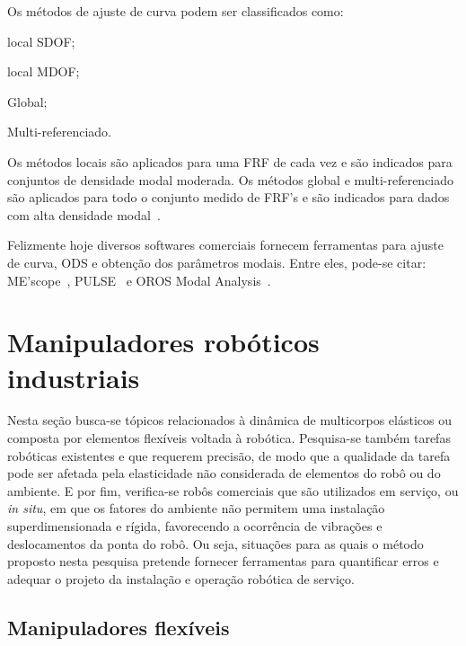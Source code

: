 Os métodos de ajuste de curva podem ser classificados como: 
%
\begin{enumerate*}[label=\emph{\alph*})]
	\item local SDOF;
	\item local MDOF;
	\item Global;
	\item Multi-referenciado.
\end{enumerate*}
%
Os métodos locais são aplicados para uma FRF de cada vez e são indicados para
conjuntos de densidade modal moderada. Os métodos global e multi-referenciado
são aplicados para todo o conjunto medido de FRF's e são indicados para dados
com alta densidade modal~\cite{schwarz1999experimental}. 

Felizmente hoje diversos softwares comerciais fornecem ferramentas para ajuste
de curva, ODS e obtenção dos parâmetros modais. Entre eles, pode-se citar:
ME'scope~\cite{mescope}, PULSE~\cite{pulse} e OROS Modal Analysis~\cite{oros}. 


\section{Manipuladores robóticos industriais}\label{sec::manind}
Nesta seção busca-se tópicos relacionados à dinâmica de multicorpos elásticos ou
composta por elementos flexíveis voltada à robótica. Pesquisa-se também tarefas
robóticas existentes e que requerem precisão, de modo que a qualidade da tarefa
pode ser afetada pela elasticidade não considerada de elementos do robô ou do
ambiente.
E por fim, verifica-se robôs comerciais que são utilizados em serviço, ou
\textit{in situ}, em que os fatores do ambiente não permitem uma instalação
superdimensionada e rígida, favorecendo a ocorrência de vibrações e
deslocamentos da ponta do robô. Ou seja, situações para as quais o método
proposto nesta pesquisa pretende fornecer ferramentas para quantificar erros e
adequar o projeto da instalação e operação robótica de serviço.

\subsection{Manipuladores flexíveis}


